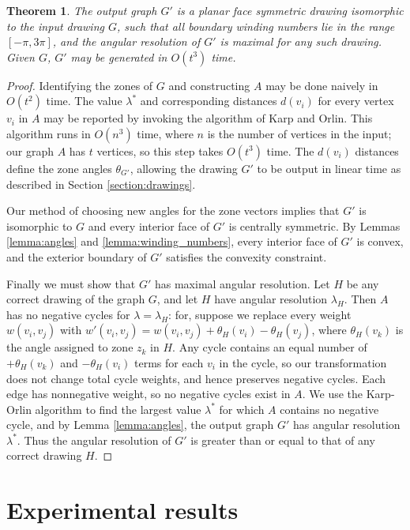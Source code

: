 \documentclass[11pt,letter]{article}
\newtheorem{theorem}{Theorem}[section]
\begin{document}
\begin{theorem}
The output graph $G'$ is a planar face symmetric drawing isomorphic to the input drawing $G$, such that all boundary winding numbers lie in the range $[-\pi,3\pi]$, and the angular resolution of $G'$ is maximal for any such drawing.  Given $G$, $G'$ may be generated in $O(t^3)$ time.
\end{theorem}

\begin{proof}
Identifying the zones of $G$ and constructing $A$ may be done naively in $O(t^2)$ time.  The value $\lambda^*$ and corresponding distances $d(v_i)$ for every vertex $v_i$ in $A$ may be reported by invoking the algorithm of Karp and Orlin.  This algorithm runs in $O(n^3)$ time, where $n$ is the number of vertices in the input; our graph $A$ has $t$ vertices, so this step takes $O(t^3)$ time.  The $d(v_i)$ distances define the zone angles $\theta_{G'}$, allowing the drawing $G'$ to be output in linear time as described in Section \ref{section:drawings}.

Our method of choosing new angles for the zone vectors implies that $G'$ is isomorphic to $G$ and every interior face of $G'$ is centrally symmetric.  By Lemmas \ref{lemma:angles} and \ref{lemma:winding_numbers}, every interior face of $G'$ is convex, and the exterior boundary of $G'$ satisfies the convexity constraint.

Finally we must show that $G'$ has maximal angular resolution.  Let $H$ be any correct drawing of the graph $G$, and let $H$ have angular resolution $\lambda_H$.  Then $A$ has no negative cycles for $\lambda=\lambda_H$: for, suppose we replace every weight $w(v_i,v_j)$ with $w'(v_i,v_j)=w(v_i,v_j)+\theta_H(v_i)-\theta_H(v_j)$, where $\theta_H(v_k)$ is the angle assigned to zone $z_k$ in $H$.  Any cycle contains an equal number of $+\theta_H(v_k)$ and $-\theta_H(v_i)$ terms for each $v_i$ in the cycle, so our transformation does not change total cycle weights, and hence preserves negative cycles.   Each edge has nonnegative weight, so no negative cycles exist in $A$.  We use the Karp-Orlin algorithm to find the largest value $\lambda^*$ for which $A$ contains no negative cycle, and by Lemma \ref{lemma:angles}, the output graph $G'$ has angular resolution $\lambda^*$.  Thus the angular resolution of $G'$ is greater than or equal to that of any correct drawing $H$.
\end{proof}

\section{Experimental results}
\end{document}
